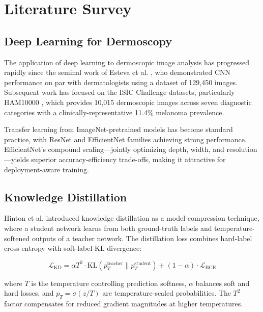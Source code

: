 \documentclass[conference]{IEEEtran}
\begin{document}
\section{Literature Survey}

\subsection{Deep Learning for Dermoscopy}

The application of deep learning to dermoscopic image analysis has progressed rapidly since the seminal work of Esteva et al. \cite{esteva2017dermatologist}, who demonstrated CNN performance on par with dermatologists using a dataset of 129,450 images. Subsequent work has focused on the ISIC Challenge datasets, particularly HAM10000 \cite{tschandl2018ham10000}, which provides 10,015 dermoscopic images across seven diagnostic categories with a clinically-representative 11.4\% melanoma prevalence.

Transfer learning from ImageNet-pretrained models has become standard practice, with ResNet \cite{he2016deep} and EfficientNet \cite{tan2019efficientnet} families achieving strong performance. EfficientNet's compound scaling---jointly optimizing depth, width, and resolution---yields superior accuracy-efficiency trade-offs, making it attractive for deployment-aware training.

\subsection{Knowledge Distillation}

Hinton et al. \cite{hinton2015distilling} introduced knowledge distillation as a model compression technique, where a student network learns from both ground-truth labels and temperature-softened outputs of a teacher network. The distillation loss combines hard-label cross-entropy with soft-label KL divergence:

\begin{equation}
\mathcal{L}_{\text{KD}} = \alpha T^2 \cdot \text{KL}(p_T^\text{teacher} \| p_T^\text{student}) + (1-\alpha) \cdot \mathcal{L}_{\text{BCE}}
\end{equation}

where $T$ is the temperature controlling prediction softness, $\alpha$ balances soft and hard losses, and $p_T = \sigma(z/T)$ are temperature-scaled probabilities. The $T^2$ factor compensates for reduced gradient magnitudes at higher temperatures.
\end{document}
